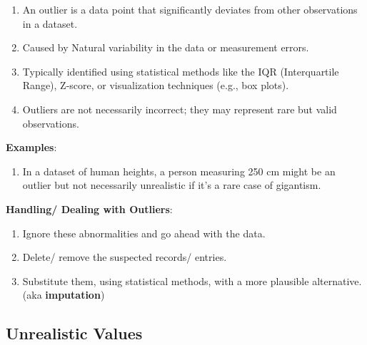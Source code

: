 \begin{enumerate}
    \item An outlier is a data point that significantly deviates from other observations in a dataset. \hfill \cite{common/online/chatgpt}

    \item Caused by Natural variability in the data or measurement errors. \hfill \cite{common/online/chatgpt}

    \item Typically identified using statistical methods like the IQR (Interquartile Range), Z-score, or visualization techniques (e.g., box plots). \hfill \cite{common/online/chatgpt}

    \item Outliers are not necessarily incorrect; they may represent rare but valid observations. \hfill \cite{common/online/chatgpt}

\end{enumerate}


\vspace{0.3cm}

\textbf{Examples}:
\begin{enumerate}
    \item In a dataset of human heights, a person measuring 250 cm might be an outlier but not necessarily unrealistic if it’s a rare case of gigantism. \hfill \cite{common/online/chatgpt}
\end{enumerate}


\vspace{0.3cm}
\textbf{Handling/ Dealing with Outliers}:
\begin{enumerate}
    \item Ignore these abnormalities and go ahead with the data. \hfill \cite{statistics/book/Statistics-for-Data-Scientists/Maurits-Kaptein}

    \item Delete/ remove the suspected records/ entries. \hfill \cite{statistics/book/Statistics-for-Data-Scientists/Maurits-Kaptein}

    \item Substitute them, using statistical methods, with a more plausible alternative. (aka \textbf{imputation}) \hfill \cite{statistics/book/Statistics-for-Data-Scientists/Maurits-Kaptein}\label{Data/Outliers/imputation}
\end{enumerate}




\subsection{Unrealistic Values \cite{statistics/book/Statistics-for-Data-Scientists/Maurits-Kaptein}}\label{Data/Measurement-Levels/Unrealistic Values}


